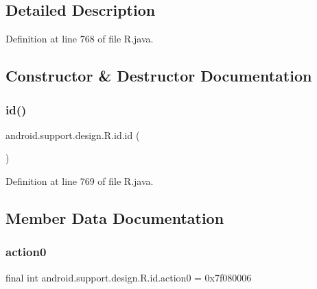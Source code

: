 \subsection{Detailed Description}


Definition at line 768 of file R.\+java.



\subsection{Constructor \& Destructor Documentation}
\mbox{\label{classandroid_1_1support_1_1design_1_1_r_1_1id_a50ff9c45db6e42295d0d7771e50055f7}} 
\subsubsection{\texorpdfstring{id()}{id()}}
{\footnotesize\ttfamily android.\+support.\+design.\+R.\+id.\+id (\begin{DoxyParamCaption}{ }\end{DoxyParamCaption})\hspace{0.3cm}{\ttfamily [private]}}



Definition at line 769 of file R.\+java.


\begin{DoxyCode}{0}

\end{DoxyCode}


\subsection{Member Data Documentation}
\mbox{\label{classandroid_1_1support_1_1design_1_1_r_1_1id_a65ca78d6559d5c73324d48f61d2af87e}} 
\subsubsection{\texorpdfstring{action0}{action0}}
{\footnotesize\ttfamily final int android.\+support.\+design.\+R.\+id.\+action0 = 0x7f080006\hspace{0.3cm}{\ttfamily [static]}}



